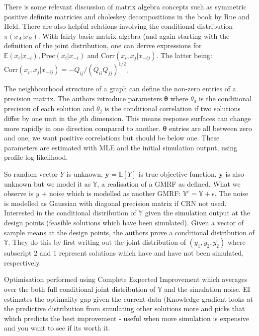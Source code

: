 \documentclass{article}
\begin{document}
There is some relevant discussion of matrix algebra concepts such as symmetric positive definite matricies and choleskey decompositions in the book by Rue and Held. There are also helpful relations involving the conditional distribution $\pi(x_A|x_B)$. With fairly basic matrix algebra (and again starting with the definition of the joint distribution, one can derive expressions for $\mathbb{E}(x_i|x_{-i}), \text{Prec}(x_i|x_{-i})$ and $\text{Corr}(x_i,x_j|x_{-ij})$. The latter being: $\text{Corr}(x_i,x_j|x_{-ij}) = -Q_{ij}/(Q_{ii}Q_{jj})^{1/2}$. \newline

The neighbourhood structure of a graph can define the non-zero entries of a precision matrix. The authors introduce parameters $\boldsymbol{\theta}$ where $\theta_0$ is the conditional precision of each solution and $\theta_j$ is the conditional correlation if two solutions differ by one unit in the $j$th dimension. This means response surfaces can change more rapidly in one direction compared to another. $\boldsymbol{\theta}$ entries are all between zero and one, we want positive correlations but should be below one. These parameters are estimated with MLE and the initial simulation output, using profile log likelihood. \newline

So random vector $Y$ is unknown, $\boldsymbol{y}=\mathbb{E}[Y]$ is true objective function. $\boldsymbol{y}$ is also unknown but we model it as $\mathbb{Y}$, a realisation of a GMRF as defined. What we observe is $y$ + noise which is modelled as another GMRF: $\mathbb{Y}^{\epsilon} = \mathbb{Y} + \epsilon$. The noise is modelled as Gaussian with diagonal precision matrix if CRN not used. Interested in the conditional distribution of $\mathbb{Y}$ given the simulation output at the design points (feasible solutions which have been simulated). Given a vector of sample means at the design points, the authors prove a conditional distribution of $\mathbb{Y}$. They do this by first writing out the joint distribution of $(y_1,y_2,y_2^{\epsilon})$ where subscript $2$ and $1$ represent solutions which have and have not been simulated, respectively.\newline

Optimisation performed using Complete Expected Improvement which averages over the both full conditional joint distribution of $\mathbb{Y}$ and the simulation noise. EI estimates the optimality gap given the current data (Knowledge gradient looks at the predictive distribution from simulating other solutions more and picks that which predicts the best improvement - useful when more simulation is expensive and you want to see if its worth it. \newline
\end{document}
